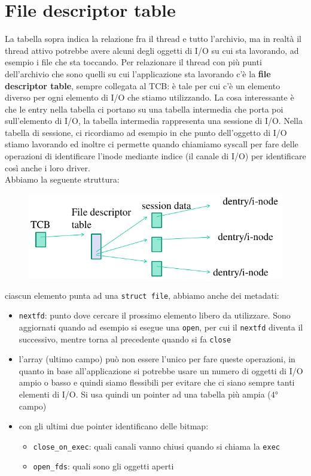 \documentclass[12pt, oneside]{extbook}
\begin{document}
\section{File descriptor table}
La tabella sopra indica la relazione fra il thread e tutto l'archivio, ma in realtà il  thread attivo potrebbe avere alcuni degli oggetti di I/O su cui sta lavorando, ad esempio i file che sta toccando. Per relazionare il thread con più punti dell'archivio che sono quelli su cui l'applicazione sta lavorando c'è la \textbf{file descriptor table}, sempre collegata al TCB: è tale per cui c'è un elemento diverso per ogni elemento di I/O che stiamo utilizzando. La cosa interessante è che le entry nella tabella ci portano su una tabella intermedia che porta poi sull'elemento di I/O, la tabella intermedia rappresenta una sessione di I/O. Nella tabella di sessione, ci ricordiamo ad esempio in che punto dell'oggetto di I/O stiamo lavorando ed inoltre ci permette quando chiamiamo syscall per fare delle operazioni di identificare l'inode mediante indice (il canale di I/O) per identificare così anche i loro driver.\\Abbiamo la seguente struttura:
\begin{figure}[!h]
	\includegraphics[scale=0.5]{immagini/fdt_scheme.png}
\end{figure}
ciascun elemento punta ad una \texttt{struct file}, abbiamo anche dei metadati:
\begin{itemize}
\item \texttt{nextfd}: punto dove cercare il prossimo elemento libero da utilizzare. Sono aggiornati quando ad esempio si esegue una \texttt{open}, per cui il \texttt{nextfd} diventa il successivo, mentre torna al precedente quando si fa \texttt{close}
\item l'array (ultimo campo) può non essere l'unico per fare queste operazioni, in quanto in base all'applicazione si potrebbe usare un numero di oggetti di I/O ampio o basso e quindi siamo flessibili per evitare che ci siano sempre tanti elementi di I/O. Si usa quindi un pointer ad una tabella più ampia (4° campo)
\item con gli ultimi due pointer identificano delle bitmap:
\begin{itemize}
\item \texttt{close\_on\_exec}: quali canali vanno chiusi quando si chiama la \texttt{exec}
\item \texttt{open\_fds}: quali sono gli oggetti aperti
\end{itemize}
\end{itemize}
\end{document}
